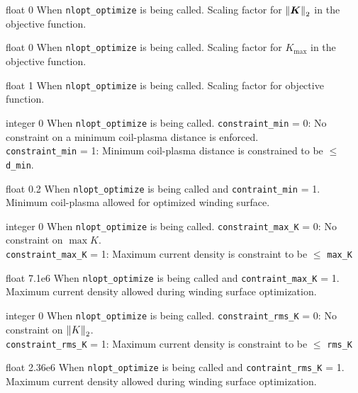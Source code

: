 \myhrule

{float}
{0}
{When \texttt{nlopt\_optimize} is being called.}
{Scaling factor for $\norm{\bm{K}}_2$ in the objective function.}

\myhrule

{float}
{0}
{When \texttt{nlopt\_optimize} is being called.}
{Scaling factor for $K_{\max}$ in the objective function.}

\myhrule

{float}
{1}
{When \texttt{nlopt\_optimize} is being called.}
{Scaling factor for objective function.}

\myhrule

{integer}
{0}
{When \texttt{nlopt\_optimize} is being called.}
{\texttt{constraint\_min} = 0: No constraint on a minimum coil-plasma distance is enforced. \\
 \texttt{constraint\_min} = 1: Minimum coil-plasma distance is constrained to be $\leq$ \texttt{d\_min}. }
 
\myhrule

{float}
{0.2}
{When \texttt{nlopt\_optimize} is being called and \texttt{contraint\_min} = 1.}
{Minimum coil-plasma allowed for optimized winding surface.}
 
 \myhrule
 
{integer}
{0}
{When \texttt{nlopt\_optimize} is being called.}
{\texttt{constraint\_max\_K} = 0: No constraint on $\max K$. \\
 \texttt{constraint\_max\_K} = 1: Maximum current density is constraint to be $\leq$ \texttt{max\_K}}
 
\myhrule

{float}
{7.1e6}
{When \texttt{nlopt\_optimize} is being called and \texttt{contraint\_max\_K} = 1.}
{Maximum current density allowed during winding surface optimization. }

\myhrule

{integer}
{0}
{When \texttt{nlopt\_optimize} is being called.}
{\texttt{constraint\_rms\_K} = 0: No constraint on $\norm{K}_2$. \\
 \texttt{constraint\_rms\_K} = 1: Maximum current density is constraint to be $\leq$ \texttt{rms\_K}}
 
\myhrule

{float}
{2.36e6}
{When \texttt{nlopt\_optimize} is being called and \texttt{contraint\_rms\_K} = 1.}
{Maximum current density allowed during winding surface optimization. }

